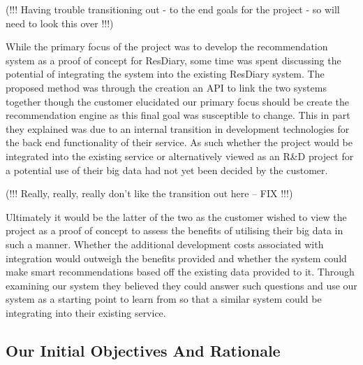 \documentclass{l3proj}
\begin{document}
(!!! Having trouble transitioning out - to the end goals for the project - so will need to look this over !!!) 

While the primary focus of the project was to develop the recommendation system as a proof of concept for ResDiary, some time was spent discussing the potential of integrating the system into the existing ResDiary system. The proposed method was through the creation an API to link the two systems together though the customer elucidated our primary focus should be create the recommendation engine as this final goal was susceptible to change. This in part they explained was due to an internal transition in development technologies for the back end functionality of their service. As such whether the project would be integrated into the existing service or alternatively viewed as an R\&D project for a potential use of their big data had not yet been decided by the customer. 

(!!! Really, really, really don’t like the transition out here -- FIX !!!)

Ultimately it would be the latter of the two as the customer wished to view the project as a proof of concept to assess the benefits of utilising their big data in such a manner. Whether the additional development costs associated with integration would outweigh the benefits provided and whether the system could make smart recommendations based off the existing data provided to it. Through examining our system they believed they could answer such questions and use our system as a starting point to learn from so that a similar system could be integrating into their existing service.


\subsection{Our Initial Objectives And Rationale}
\label{ourinitobjectives}
\end{document}
